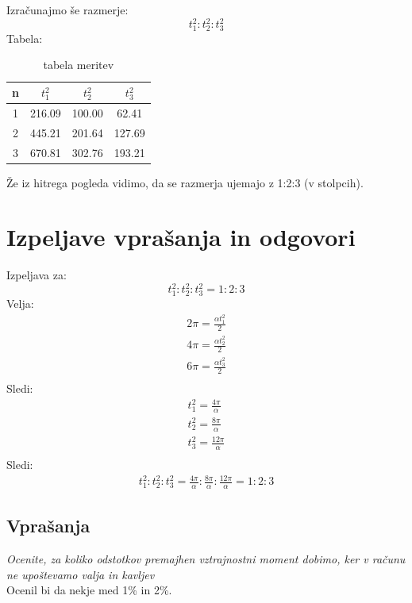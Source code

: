 \documentclass[11pt]{article}
\begin{document}
    Izračunajmo še razmerje:
    \[
        t_1^2 : t_2^2 : t_3^2
    \]
    Tabela:
    \begin{table}[H]
        \centering
        \begin{tabular}{|c|c|c|c|}
            \hline
            n & $t_1^2$ & $t_2^2$ & $t_3^2$\\
            \hline
            1 & 216.09 & 100.00 &  62.41 \\
            2 & 445.21 & 201.64 & 127.69 \\
            3 & 670.81 & 302.76 & 193.21 \\
            \hline
        \end{tabular}
        \caption{tabela meritev}
        \label{tab:3}
    \end{table}
    Že iz hitrega pogleda vidimo, da se razmerja ujemajo z 1:2:3 (v stolpcih).

    \section{Izpeljave vprašanja in odgovori}
    Izpeljava za:
    \[
        t_1^2 : t_2^2 : t_3^2 = 1:2:3
    \]
    Velja:
    \begin{align*}
        2 \pi = \frac{\alpha t_1^2}{2} \\
        4 \pi = \frac{\alpha t_2^2}{2} \\
        6 \pi = \frac{\alpha t_3^2}{2} \\
    \end{align*}
    Sledi:
    \begin{align*}
        t_1^2 = \frac{4 \pi }{\alpha}\\
        t_2^2 = \frac{8 \pi }{\alpha}\\
        t_3^2 = \frac{12 \pi }{\alpha}\\
    \end{align*}
    Sledi:
    \begin{align*}
        t_1^2 : t_2^2 : t_3^2 =  \frac{4 \pi }{\alpha}: \frac{8 \pi }{\alpha} : \frac{12 \pi }{\alpha} = 1:2:3
    \end{align*}

    \subsection{Vprašanja}
    \textit{Ocenite, za koliko odstotkov premajhen vztrajnostni moment dobimo, ker v računu
    ne upoštevamo valja in kavljev}
    \\
    Ocenil bi da nekje med 1\% in 2\%.
    
\end{document}
